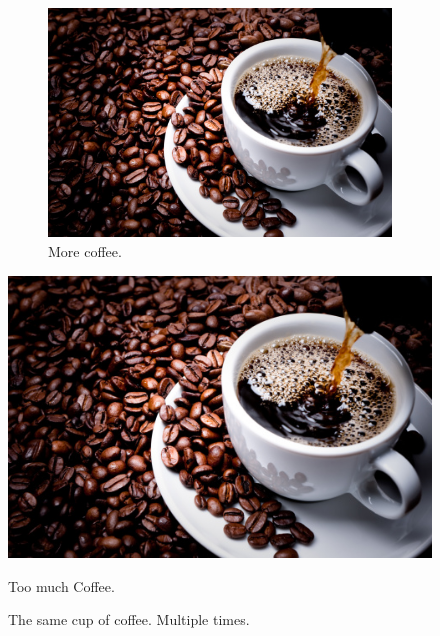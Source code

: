 \documentclass{article}
\begin{document}
\begin{figure}[h!]
\begin{subfigure}[b]{0.2\linewidth}
			\includegraphics[width=\line]{coffe.jpg}
			\caption{More coffee.}
		\end{subfigure}
		\includegraphics[width=\linewidth]{coffe.jpg}
		\caption{ Too much Coffee.}
		\caption{The same cup of coffee. Multiple times.}
		\label{fig:coffee}
	\end{figure}
\end{document}
